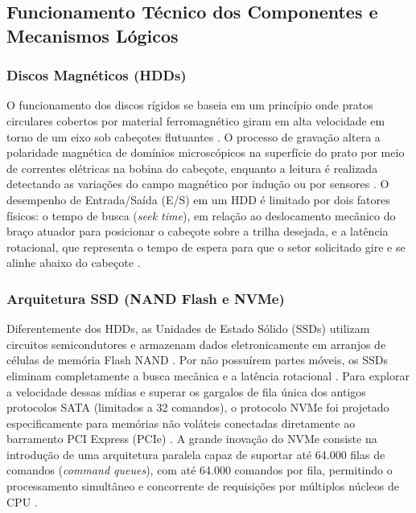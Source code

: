 \documentclass[12pt]{article}
\begin{document}
\subsection{Funcionamento Técnico dos Componentes e Mecanismos Lógicos} 
\subsubsection{Discos Magnéticos (HDDs)} 

O funcionamento dos discos rígidos se baseia em um princípio onde pratos circulares cobertos por material ferromagnético giram em alta velocidade em torno de um eixo sob cabeçotes flutuantes \cite{oliveira2010, stallings2017}. O processo de gravação altera a polaridade magnética de domínios microscópicos na superfície do prato por meio de correntes elétricas na bobina do cabeçote, enquanto a leitura é realizada detectando as variações do campo magnético por indução ou por sensores \cite{oliveira2010, stallings2017}. O desempenho de Entrada/Saída (E/S) em um HDD é limitado por dois fatores físicos: o tempo de busca (\textit{seek time}), em relação ao deslocamento mecânico do braço atuador para posicionar o cabeçote sobre a trilha desejada, e a latência rotacional, que representa o tempo de espera para que o setor solicitado gire e se alinhe abaixo do cabeçote \cite{oliveira2010, stallings2017}. 

\subsubsection{Arquitetura SSD (NAND Flash e NVMe)} 

Diferentemente dos HDDs, as Unidades de Estado Sólido (SSDs) utilizam circuitos semicondutores e armazenam dados eletronicamente em arranjos de células de memória Flash NAND \cite{santos2014, stallings2017}. Por não possuírem partes móveis, os SSDs eliminam completamente a busca mecânica e a latência rotacional \cite{santos2014}. Para explorar a velocidade dessas mídias e superar os gargalos de fila única dos antigos protocolos SATA (limitados a 32 comandos), o protocolo NVMe foi projetado especificamente para memórias não voláteis conectadas diretamente ao barramento PCI Express (PCIe) \cite{george2023, xu2015}. A grande inovação do NVMe consiste na introdução de uma arquitetura paralela capaz de suportar até 64.000 filas de comandos (\textit{command queues}), com até 64.000 comandos por fila, permitindo o processamento simultâneo e concorrente de requisições por múltiplos núcleos de CPU \cite{george2023, xu2015}. 
\end{document}
